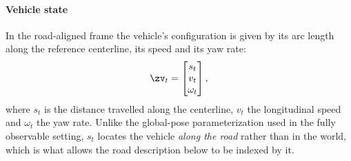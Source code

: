 %
%
%
%

\paragraph{Vehicle state}
In the road-aligned frame the vehicle's configuration is given by its arc length
along the reference centerline, its speed and its yaw rate:
\begin{equation}
    \zv_t =
    \begin{bmatrix}
        s_t \\ v_t \\ \omega_t
    \end{bmatrix},
    \label{eq:vehicle_rel}
\end{equation}
where $s_t$ is the distance travelled along the centerline, $v_t$ the
longitudinal speed and $\omega_t$ the yaw rate. Unlike the global-pose
parameterization used in the fully observable setting, $s_t$ locates the vehicle
\emph{along the road} rather than in the world, which is what allows the road
description below to be indexed by it.

